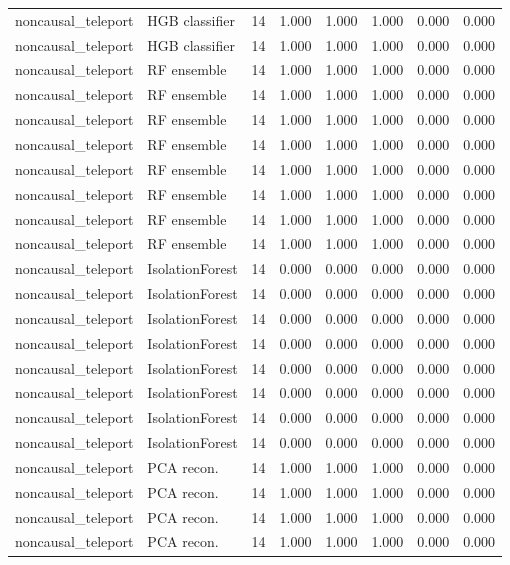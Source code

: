{\begin{longtable}{llrrrrrr}
noncausal\_teleport & HGB classifier & 14 & 1.000 & 1.000 & 1.000 & 0.000 & 0.000 \\
noncausal\_teleport & HGB classifier & 14 & 1.000 & 1.000 & 1.000 & 0.000 & 0.000 \\
noncausal\_teleport & RF ensemble & 14 & 1.000 & 1.000 & 1.000 & 0.000 & 0.000 \\
noncausal\_teleport & RF ensemble & 14 & 1.000 & 1.000 & 1.000 & 0.000 & 0.000 \\
noncausal\_teleport & RF ensemble & 14 & 1.000 & 1.000 & 1.000 & 0.000 & 0.000 \\
noncausal\_teleport & RF ensemble & 14 & 1.000 & 1.000 & 1.000 & 0.000 & 0.000 \\
noncausal\_teleport & RF ensemble & 14 & 1.000 & 1.000 & 1.000 & 0.000 & 0.000 \\
noncausal\_teleport & RF ensemble & 14 & 1.000 & 1.000 & 1.000 & 0.000 & 0.000 \\
noncausal\_teleport & RF ensemble & 14 & 1.000 & 1.000 & 1.000 & 0.000 & 0.000 \\
noncausal\_teleport & RF ensemble & 14 & 1.000 & 1.000 & 1.000 & 0.000 & 0.000 \\
noncausal\_teleport & IsolationForest & 14 & 0.000 & 0.000 & 0.000 & 0.000 & 0.000 \\
noncausal\_teleport & IsolationForest & 14 & 0.000 & 0.000 & 0.000 & 0.000 & 0.000 \\
noncausal\_teleport & IsolationForest & 14 & 0.000 & 0.000 & 0.000 & 0.000 & 0.000 \\
noncausal\_teleport & IsolationForest & 14 & 0.000 & 0.000 & 0.000 & 0.000 & 0.000 \\
noncausal\_teleport & IsolationForest & 14 & 0.000 & 0.000 & 0.000 & 0.000 & 0.000 \\
noncausal\_teleport & IsolationForest & 14 & 0.000 & 0.000 & 0.000 & 0.000 & 0.000 \\
noncausal\_teleport & IsolationForest & 14 & 0.000 & 0.000 & 0.000 & 0.000 & 0.000 \\
noncausal\_teleport & IsolationForest & 14 & 0.000 & 0.000 & 0.000 & 0.000 & 0.000 \\
noncausal\_teleport & PCA recon. & 14 & 1.000 & 1.000 & 1.000 & 0.000 & 0.000 \\
noncausal\_teleport & PCA recon. & 14 & 1.000 & 1.000 & 1.000 & 0.000 & 0.000 \\
noncausal\_teleport & PCA recon. & 14 & 1.000 & 1.000 & 1.000 & 0.000 & 0.000 \\
noncausal\_teleport & PCA recon. & 14 & 1.000 & 1.000 & 1.000 & 0.000 & 0.000 \\

\end{longtable}}

